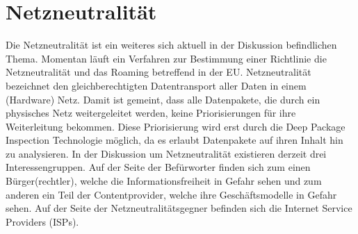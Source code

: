 \documentclass[
	12pt,
	a4paper,
	BCOR10mm,
	DIV14,
	listof=totoc,
	bibliography=totoc,
	headsepline
]{scrreprt}
\begin{document}

\section{Netzneutralität}
\label{netneutr}
Die Netzneutralität ist ein weiteres sich aktuell in der Diskussion befindlichen Thema.
Momentan läuft ein Verfahren zur Bestimmung einer Richtlinie die Netzneutralität und das Roaming betreffend in der EU.
Netzneutralität bezeichnet den gleichberechtigten Datentransport aller Daten in einem (Hardware) Netz.
Damit ist gemeint, dass alle Datenpakete, die durch ein physisches Netz weitergeleitet werden, keine Priorisierungen für ihre Weiterleitung bekommen.
Diese Priorisierung wird erst durch die Deep Package Inspection Technologie möglich, da es erlaubt Datenpakete auf ihren Inhalt hin zu analysieren.
In der Diskussion um Netzneutralität existieren derzeit drei Interessengruppen.
Auf der Seite der Befürworter finden sich zum einen Bürger(rechtler), welche die Informationsfreiheit in Gefahr sehen und zum anderen ein Teil der Contentprovider, welche ihre Geschäftsmodelle in Gefahr sehen.
Auf der Seite der Netzneutralitätsgegner befinden sich die Internet Service Providers (ISPs).
\end{document}
